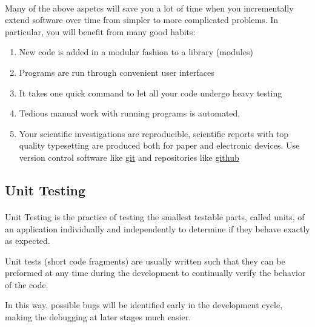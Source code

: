 \paragraph{}
Many of the above aspetcs  will save you a lot of time when you incrementally extend software over time from simpler to more complicated problems. In particular, you will benefit from many good habits:
\begin{enumerate}
\item New code is added in a modular fashion to a library (modules)

\item Programs are run through convenient user interfaces

\item It takes one quick command to let all your code undergo heavy testing 

\item Tedious manual work with running programs is automated,

\item Your scientific investigations are reproducible, scientific reports with top quality typesetting are produced both for paper and electronic devices. Use version control software like \href{{https://git-scm.com/}}{git} and repositories like \href{{https://github.com/}}{github}
\end{enumerate}

\noindent



\subsection*{Unit Testing}

\paragraph{}
Unit Testing is the practice of testing the smallest testable parts,
called units, of an application individually and independently to
determine if they behave exactly as expected. 

Unit tests (short code
fragments) are usually written such that they can be preformed at any
time during the development to continually verify the behavior of the
code. 

In this way, possible bugs will be identified early in the
development cycle, making the debugging at later stages much
easier.



